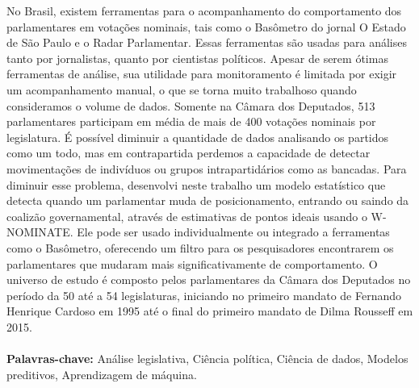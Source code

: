 No Brasil, existem ferramentas para o acompanhamento do comportamento dos
parlamentares em votações nominais, tais como o Basômetro do jornal O Estado de
São Paulo e o Radar Parlamentar. Essas ferramentas são usadas para análises
tanto por jornalistas, quanto por cientistas políticos.
Apesar de serem ótimas ferramentas de análise, sua utilidade para monitoramento
é limitada por exigir um acompanhamento manual, o que se torna muito trabalhoso
quando consideramos o volume de dados. Somente na Câmara dos Deputados, 513
parlamentares participam em média de mais de 400 votações nominais por
legislatura. É possível diminuir a quantidade de dados analisando os partidos
como um todo, mas em contrapartida perdemos a capacidade de detectar
movimentações de indivíduos ou grupos intrapartidários como as bancadas.
Para diminuir esse problema, desenvolvi neste trabalho um modelo estatístico
que detecta quando um parlamentar muda de posicionamento, entrando ou saindo da
coalizão governamental, através de estimativas de pontos ideais usando o
W-NOMINATE. Ele pode ser usado individualmente ou integrado a ferramentas como
o Basômetro, oferecendo um filtro para os pesquisadores encontrarem os
parlamentares que mudaram mais significativamente de comportamento.
O universo de estudo é composto pelos parlamentares da Câmara dos Deputados no
período da 50\textordfeminine{} até a 54\textordfeminine{} legislaturas,
iniciando no primeiro mandato de Fernando Henrique Cardoso em 1995 até o final
do primeiro mandato de Dilma Rousseff em 2015.
\\
\\
\textbf{Palavras-chave:} Análise legislativa, Ciência política, Ciência de
dados, Modelos preditivos, Aprendizagem de máquina.

